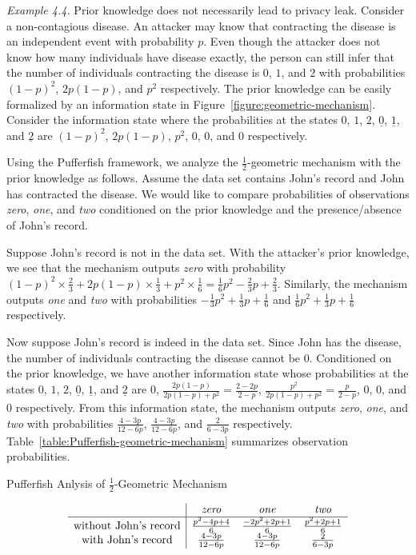 \noindent
\textit{Example 4.4.}
Prior knowledge does not necessarily lead to privacy leak. Consider a
non-contagious disease. An attacker may know that contracting the
disease is an independent event with probability $p$. Even though the
attacker does not know how many individuals have disease exactly, the
person can still infer that the number of individuals contracting the
disease is $0$, $1$, and $2$ with probabilities $(1-p)^2$, $2p(1-p)$,
and $p^2$ respectively. The prior knowledge can be easily formalized
by an information state in Figure~\ref{figure:geometric-mechanism}.
Consider the information
state where the probabilities at the states $0$, $1$, $2$,
$\underline{0}$, $\underline{1}$, and $\underline{2}$ are $(1-p)^2$,
$2p(1-p)$, $p^2$, $0$, $0$, and $0$ respectively.

Using the Pufferfish framework, we analyze the $\frac{1}{2}$-geometric
mechanism with the prior knowledge as follows. Assume the data set
contains John's record and John has contracted the disease. We would
like to compare probabilities of observations \textit{zero},
\textit{one}, and \textit{two} conditioned on the prior knowledge and
the presence/absence of John's record.

Suppose John's record is not in the data set. With the attacker's
prior knowledge, we see that the mechanism outputs \textit{zero} with
probability $(1-p)^2 \times \frac{2}{3} + 2p(1-p) \times \frac{1}{3} +
p^2 \times \frac{1}{6} = \frac{1}{6} p^2 - \frac{2}{3} p +
\frac{2}{3}$. Similarly, the mechanism outputs \textit{one} and
\textit{two} with probabilities $-\frac{1}{3} p^2 + \frac{1}{3} p +
\frac{1}{6}$ and $\frac{1}{6} p^2 + \frac{1}{3} p + \frac{1}{6}$
respectively.

Now suppose John's record is indeed in the data set. Since John has
the disease, the number of individuals contracting the disease cannot
be $0$. Conditioned on the prior knowledge, we have another
information state whose probabilities at the states $0$, $1$, $2$,
$\underline{0}$, $\underline{1}$, and $\underline{2}$ are $0$,
$\frac{2p(1-p)}{2p(1-p) + p^2} = \frac{2-2p}{2-p}$,
$\frac{p^2}{2p(1-p) + p^2} = \frac{p}{2-p}$, $0$, $0$, and $0$
respectively. From this information state, the mechanism outputs
\textit{zero}, \textit{one}, and \textit{two} with probabilities
$\frac{4-3p}{12-6p}$, $\frac{4-3p}{12-6p}$, and $\frac{2}{6-3p}$
respectively. Table~\ref{table:Pufferfish-geometric-mechanism}
summarizes observation probabilities.

\begin{table}
  \caption{Pufferfish Anlysis of $\frac{1}{2}$-Geometric Mechanism}
  \label{table:Pufferfish-geometric-mechanism}
  \centering
  \[
    \begin{array}{c|ccc}
      & \textit{zero} & \textit{one} & \textit{two} \\
      \hline
      \textmd{without John's record}
      & \frac{p^2 - 4p + 4}{6}
      & \frac{-2p^2 + 2p + 1}{6}
      & \frac{p^2 + 2p + 1}{6}
      \\

      \textmd{with John's record}
      & \frac{4-3p}{12-6p}
      & \frac{4-3p}{12-6p}
      & \frac{2}{6-3p}
    \end{array}
  \]
\end{table}

